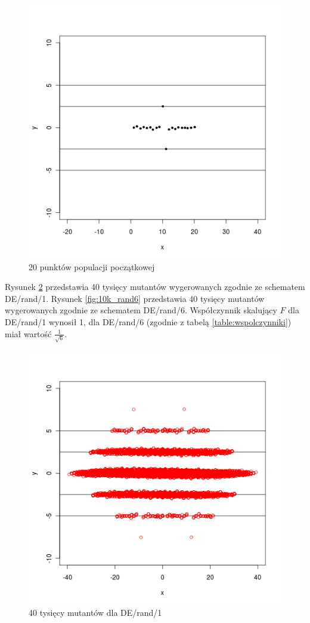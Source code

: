 \documentclass[a4paper,onecolumn,oneside,12pt,wide,floatssmall]{mwrep}
\theoremstyle{definition}
\theoremstyle{plain}%
\theoremstyle{remark}
\begin{document}
\begin{figure}[H]
\centering
\includegraphics[width=.5\textwidth]{img/pop} 
\caption{20 punktów populacji początkowej} 
\label{fig:10k_start}
\end{figure}

Rysunek \ref{fig:10k_rand1} przedstawia 40 tysięcy mutantów wygerowanych zgodnie ze schematem DE/rand/1.
Rysunek \ref{fig:10k_rand6} przedstawia 40 tysięcy mutantów wygerowanych zgodnie ze schematem DE/rand/6.
Współczynnik skalujący $F$ dla 
DE/rand/1 wynosił 1, dla DE/rand/6 (zgodnie z tabelą \ref{table:wspolczynniki}) miał wartość $\frac{1}{\sqrt{6}}$.

\begin{figure}[H]
\centering
\includegraphics[width=.65\textwidth]{img/rand1}
\caption{40 tysięcy mutantów dla DE/rand/1} 
\label{fig:10k_rand1}
\end{figure}
\end{document}
